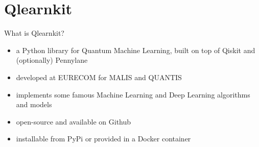 \graphicspath{{assets/qlearnkit/}}

\section{Qlearnkit}


\begin{frame}{What is Qlearnkit?}
    \begin{itemize}
        \item a Python library for \alert{Quantum Machine Learning}, built on top of \alert{Qiskit} and (optionally) \alert{Pennylane}
        \item developed at EURECOM for \alert{MALIS} and \alert{QUANTIS}
        \item implements some famous Machine Learning and Deep Learning algorithms and models
        \item open-source and available on Github
        \item installable from PyPi or provided in a Docker container 
        \vspace{0.5cm}
        

\end{itemize}
\end{frame}
